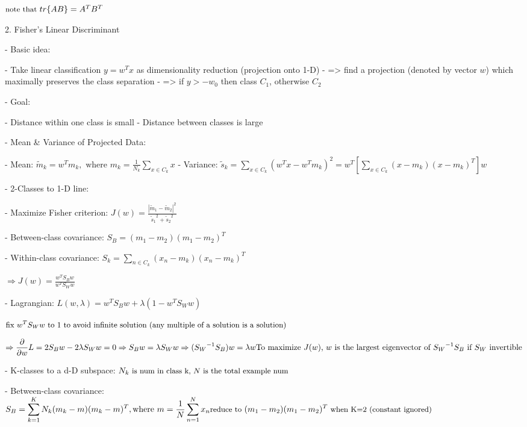 	$\small \text{note that } tr\{ AB \} = A^TB^T$ 

2. Fisher’s Linear Discriminant

- Basic idea:

- Take linear classification $y = w^Tx$ as dimensionality reduction (projection onto 1-D)
- => find a projection (denoted by vector $w$) which maximally preserves the class separation
- => if $y>-w_0$ then class $C_1$, otherwise $C_2$ 

- Goal:

- Distance within one class is small
- Distance between classes is large

- Mean \& Variance of Projected Data:

- Mean: $\displaystyle\widetilde m_k = w^Tm_k, \text{ where } m_k = \frac 1 {N_k}\sum_{x\in C_k} x$ 
- Variance: $\displaystyle \widetilde s_k=\sum_{x\in C_k}(w^Tx-w^Tm_k)^2 =   w^T[\sum_{x\in C_k}(x-m_k)(x-m_k)^T]w$ 

- 2-Classes to 1-D line:

- Maximize Fisher criterion: $\displaystyle J(w) = \frac {|\widetilde m_1 - \widetilde m_2|^2} {{\widetilde s_1}^2+{\widetilde s_2}^2}$ 

- Between-class covariance:  $\displaystyle S_B = (m_1-m_2)(m_1-m_2)^T$ 

- Within-class covariance: $\displaystyle S_k=\sum_{n\in C_k}(x_n-m_k)(x_n-m_k)^T$ 

$\displaystyle\Rightarrow J(w) = \frac {w^TS_B w} {w^T S_W w} $ 

- Lagrangian: $L(w,\lambda) = w^TS_B w + \lambda(1- w^T S_W w)$ 

	$\small \text{fix $w^T S_W w$ to 1 to avoid infinite solution (any multiple of a solution is a solution)}$

$\Rightarrow \displaystyle \frac \partial {\partial w}L = 2S_Bw-2\lambda S_Ww=0 \\ \Rightarrow S_Bw=\lambda S_Ww \\ \Rightarrow ({S_W}^{-1}S_B)w=\lambda w \\ \text{To maximize $J(w)$, $w$ is the largest eigenvector of ${S_W}^{-1}S_B$ if $S_W$ invertible} $ 

- K-classes to a d-D subspace: $\small N_k \text{ is num in class k, $N$ is the total example num}$ 

- Between-class covariance:  $\displaystyle S_B = \sum_{k=1}^K N_k(m_k-m)(m_k-m)^T, \text{where } m=\frac 1 N \sum_{n=1}^N x_n  \\ \small \text{reduce to } (m_1-m_2)(m_1-m_2)^T  \text{ when K=2 (constant ignored)}$ 


